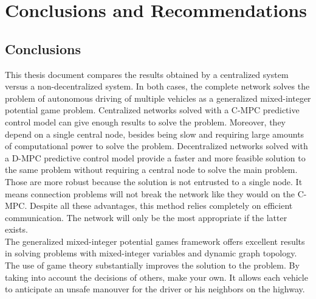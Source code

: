 
\chapter{Conclusions and Recommendations}

\section{Conclusions}

This thesis document compares the results obtained by a centralized system versus a non-decentralized system. In both cases, the complete network solves the problem of autonomous driving of multiple vehicles as a generalized mixed-integer potential game problem. Centralized networks solved with a C-MPC predictive control model can give enough results to solve the problem. Moreover, they depend on a single central node, besides being slow and requiring large amounts of computational power to solve the problem. Decentralized networks solved with a D-MPC predictive control model provide a faster and more feasible solution to the same problem without requiring a central node to solve the main problem. Those are more robust because the solution is not entrusted to a single node. It means connection problems will not break the network like they would on the C-MPC. Despite all these advantages, this method relies completely on efficient communication. The network will only be the most appropriate if the latter exists.
\\

The generalized mixed-integer potential games framework offers excellent results in solving problems with mixed-integer variables and dynamic graph topology. The use of game theory substantially improves the solution to the problem. By taking into account the decisions of others, make your own. It allows each vehicle to anticipate an unsafe manouver for the driver or his neighbors on the highway.
\\



